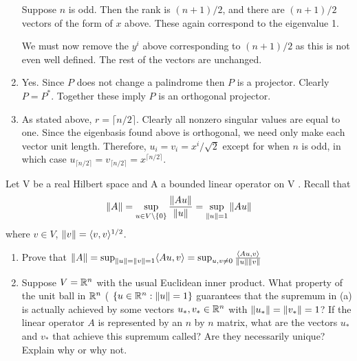 \documentclass[10pt]{article}
\begin{document}
\begin{solution}[Solution]
\begin{enumerate}[label=(\alph*)]
    Suppose \( n \) is odd. Then the rank is \( (n+1)/2 \), and there are \( (n+1)/2 \) vectors of the form of \( x \) above. These again correspond to the eigenvalue 1.

    We must now remove the \( y^i \) above corresponding to \( (n+1)/2 \) as this is not even well defined. The rest of the vectors are unchanged.

    \item
    Yes. Since \( P \) does not change a palindrome then \( P \) is a projector. Clearly \( P = P^* \). Together these imply \( P \) is an orthogonal projector.

    \item
    As stated above, \( r = \lceil n/2 \rceil \). Clearly all nonzero singular values are equal to one. Since the eigenbasis found above is orthogonal, we need only make each vector unit length. Therefore, \( u_i = v_i = x^i/ \sqrt{2} \) except for when \( n \) is odd, in which case \( u_{\lceil n/2 \rceil} = v_{\lceil n/2 \rceil} = x^{\lceil n/2 \rceil} \).



\end{enumerate}
\end{solution}

\begin{problem}
Let V be a real Hilbert space and A a bounded linear operator on V . Recall that
\begin{align*}
    \left\lVert A\right\rVert = \sup_{u\in V\setminus\{0\}} \dfrac{\left\lVert Au\right\rVert}{\left\lVert u\right\rVert} = \sup_{\left\lVert u\right\rVert = 1} \left\lVert Au\right\rVert
\end{align*}
where \( v\in V \), \( \left\lVert v\right\rVert = \langle v,v\rangle^{1/2} \).
\begin{enumerate}[label=(\alph*), nolistsep]
\item Prove that \( \left\lVert A\right\rVert = \sup_{\left\lVert u\right\rVert = \left\lVert v\right\rVert = 1}\langle Au, v\rangle = \sup_{u, v\neq 0} \frac{\langle Au, v\rangle }{\left\lVert u\right\rVert\left\lVert v\right\rVert} \)
\item Suppose \( V= \mathbb{R}^n \) with the usual Euclidean inner product. What property of the unit ball in \( \mathbb{R}^n \) ( \( \{u\in\mathbb{R}^n : \left\lVert u\right\rVert = 1\} \) guarantees that the supremum in (a) is actually
achieved by some vectors \( u_*, v_* \in \mathbb{R}^n \) with \( \left\lVert u_*\right\rVert = \left\lVert v_*\right\rVert = 1 \)? If the linear operator \( A \) is represented by an \( n \) by \( n \) matrix, what are the vectors \( u_* \) and \( v_* \) that achieve this supremum called? Are they necessarily unique? Explain why or why not.
\end{enumerate}
\end{problem}
\end{document}
